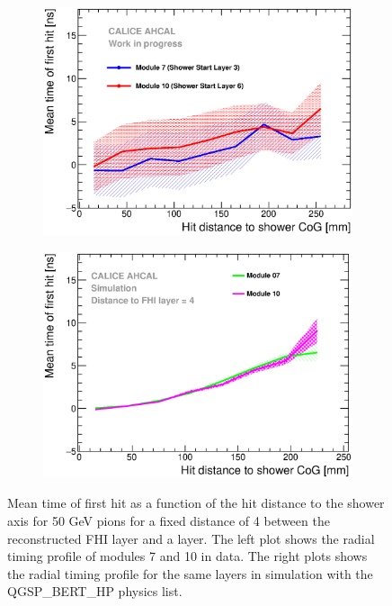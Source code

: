 \documentclass{JINST}
\begin{document}
\begin{figure}[htbp!]
	\begin{subfigure}[t]{0.49\textwidth}
		\centering
		\includegraphics[width=1\textwidth]{fig/Timing_Radius_Comparison_ShortAsymRange_ShowerStart.eps}
		\caption{}\label{fig:Radius_FHI}
	\end{subfigure}
	\hfill
	\begin{subfigure}[t]{0.49\textwidth}
		\centering
		\includegraphics[width=1\textwidth]{fig/Radius_ShowerStartTruth.eps}
		\caption{}\label{fig:Radius_FHISim1}
	\end{subfigure}
	\caption{Mean time of first hit as a function of the hit distance to the shower axis for 50 GeV pions for a fixed distance of 4 between the reconstructed FHI layer and a layer. The left plot shows the radial timing profile of modules 7 and 10 in data. The right plots shows the radial timing profile for the same layers in simulation with the QGSP\_BERT\_HP physics list.}
	\label{fig:Radius_FHIAll}
\end{figure}
\end{document}
